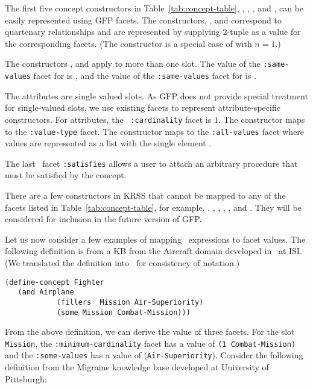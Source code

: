 The first five concept constructors in Table~\ref{tab:concept-table},
, , ,
 and , can be
easily represented using GFP  facets.
The constructors, ,
 and 
correspond to quartenary relationships and are
represented by supplying 2-tuple  as a value for the
corresponding facets. 
(The constructor  is a special case of
 with $n=1$.) 

The constructors ,
 and 
apply to more than one slot.  The value of the {\tt :same-values}
facet for  is , and the value of the 
{\tt :same-values} facet for  is .

The attributes are single valued slots.  As GFP does not provide
special treatment for single-valued slots, we use existing facets to
represent attribute-specific constructors.  For attributes, the {\tt
:cardinality} facet is 1.  The constructor  maps to
the {\tt :value-type} facet. The constructor  maps to
the {\tt :all-values} facet where values are represented as a list
with the single element .

The last \KRSS\ facet {\tt :satisfies} allows a user
to attach an arbitrary procedure that must be satisfied by the concept.  

There are a few constructors in KRSS that cannot be mapped to any of
the facets listed in Table~\ref{tab:concept-table}, for example,
, , , ,
, and .  They will be considered for 
inclusion in the future version of GFP.

Let us now consider a few  examples of mapping \KRSS\ expressions to
facet values.  The following definition is from a KB from
the Aircraft domain developed in \Loom\ at ISI.  (We translated the
definition into \KRSS\ for consistency of notation.)

\begin{verbatim}
(define-concept Fighter
   (and Airplane
            (fillers  Mission Air-Superiority)
            (some Mission Combat-Mission)))
\end{verbatim}

From the above definition, we can derive the value of three facets.  
For the slot {\tt Mission}, the {\tt :minimum-cardinality}
facet  has a value of {\tt (1 Combat-Mission)} and the {\tt :some-values}
has a value of ({\tt Air-Superiority}).   Consider
the following definition from the Migraine knowledge base developed
at University of Pittsburgh:

